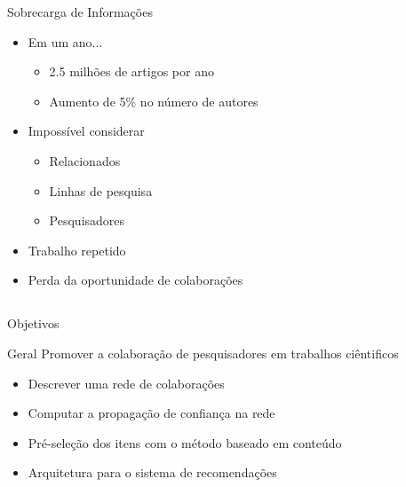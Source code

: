 \documentclass{beamer}
\begin{document}
\begin{frame}{Sobrecarga de Informações}{}

  \begin{itemize}
    \item Em um ano... 
    \begin{itemize}
      \item 2.5 milhões de artigos por ano
      \item Aumento de 5\% no número de autores 
    \end{itemize}

    \item Impossível considerar
    \begin{itemize}
      \item Relacionados
      \item Linhas de pesquisa
      \item Pesquisadores 
    \end{itemize}

    \item Trabalho repetido
    \item Perda da oportunidade de colaborações 

  \end{itemize}

\end{frame}

\subsection[Objetivos]{}

\begin{frame}{Objetivos}{}

  \begin{block}{Geral}
    Promover a colaboração de pesquisadores em trabalhos ciêntificos
  \end{block}

  \begin{itemize}
    \item Descrever uma rede de colaborações
    \item Computar a propagação de confiança na rede 
    \item Pré-seleção dos itens com o método baseado em conteúdo
    \item Arquitetura para o sistema de recomendações
  \end{itemize}

\end{frame}

\subsection[Revisão Bibliográfica]{}
\end{document}
